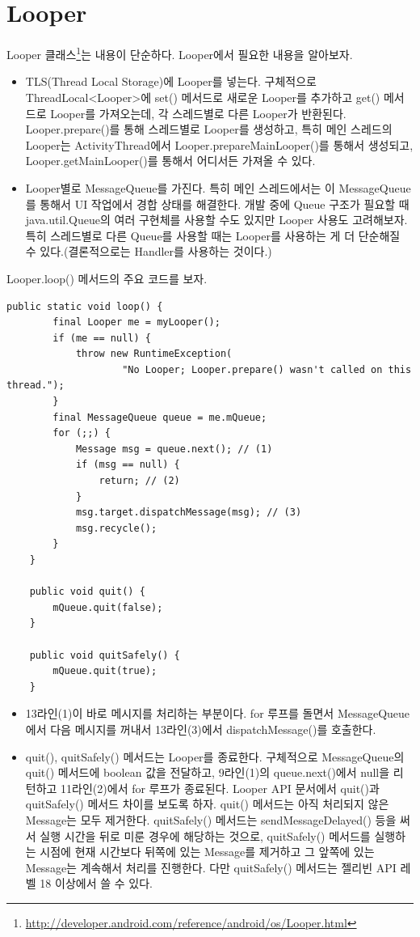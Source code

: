 \section{Looper}
Looper 클래스\footnote{\url{http://developer.android.com/reference/android/os/Looper.html}}는 내용이 단순하다. Looper에서 필요한 내용을 알아보자.
\begin{itemize}
\item TLS(Thread Local Storage)에 Looper를 넣는다. 구체적으로 ThreadLocal<Looper>에 set() 메서드로 새로운 Looper를 추가하고 get() 메서드로 Looper를 가져오는데, 각 스레드별로 다른 Looper가 반환된다.
Looper.prepare()를 통해 스레드별로 Looper를 생성하고, 특히 메인 스레드의 Looper는 ActivityThread에서 Looper.prepareMainLooper()를 통해서 생성되고, Looper.getMainLooper()를 통해서 어디서든 가져올 
수 있다.
\item Looper별로 MessageQueue를 가진다. 특히 메인 스레드에서는 이 MessageQueue를 통해서 UI 작업에서 경합 상태를 해결한다. 
개발 중에 Queue 구조가 필요할 때 java.util.Queue의 여러 구현체를 사용할 수도 있지만 Looper 사용도 고려해보자. 특히 스레드별로 다른 Queue를 사용할 때는 Looper를 사용하는 게 더 단순해질 수 있다.(결론적으로는 Handler를 사용하는 것이다.)
\end{itemize}

Looper.loop() 메서드의 주요 코드를 보자.
\begin{lstlisting}[frame=single, caption=Looper.java] 
	public static void loop() {
		final Looper me = myLooper();
		if (me == null) {
			throw new RuntimeException(
					"No Looper; Looper.prepare() wasn't called on this thread.");
		}
		final MessageQueue queue = me.mQueue;
		for (;;) {
			Message msg = queue.next(); // (1)
			if (msg == null) {
				return; // (2)
			}
			msg.target.dispatchMessage(msg); // (3)
			msg.recycle();
		}
	}
	
	public void quit() {
        mQueue.quit(false);
    }
    
    public void quitSafely() {
        mQueue.quit(true);
    }
\end{lstlisting}	
\begin{itemize}
\item 13라인(1)이 바로 메시지를 처리하는 부분이다. 
for 루프를 돌면서 MessageQueue에서 다음 메시지를 꺼내서 13라인(3)에서 dispatchMessage()를 호출한다. 
\item quit(), quitSafely() 메서드는 Looper를 종료한다. 구체적으로 MessageQueue의 quit() 메서드에 boolean 값을 전달하고, 9라인(1)의 queue.next()에서 null을 리턴하고 11라인(2)에서 for 루프가 종료된다.
Looper API 문서에서 quit()과 quitSafely() 메서드 차이를 보도록 하자.
quit() 메서드는 아직 처리되지 않은 Message는 모두 제거한다.
quitSafely() 메서드는 sendMessageDelayed() 등을 써서 실행 시간을 뒤로 미룬 경우에 해당하는 것으로, quitSafely() 메서드를 실행하는 시점에 현재 시간보다 뒤쪽에 있는 Message를 제거하고 그 앞쪽에 있는 Message는 계속해서 처리를 진행한다. 다만 quitSafely() 메서드는 젤리빈 API 레벨 18 이상에서 쓸 수 있다.\\
\end{itemize}


